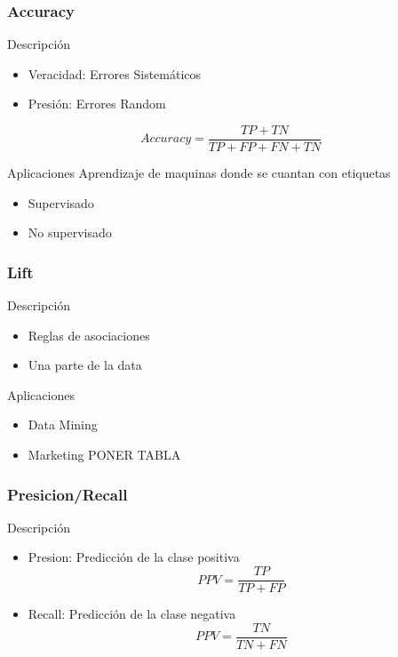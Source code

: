 \documentclass{beamer}
\begin{document}
\begin{frame}
  \frametitle{Accuracy}

  \begin{block}{Descripci\'on}
  \begin{itemize}
  \item Veracidad: Errores Sistem\'aticos
  \item Presi\'on: Errores Random
   
  \end{itemize}
  	
  	\[Accuracy= \dfrac{TP+TN}{TP+FP+FN+TN} \] 
  \end{block}
  \begin{block}{Aplicaciones}
  	Aprendizaje de maquinas donde se cuantan con etiquetas
  	\begin{itemize}
  \item Supervisado
  \item No supervisado
   
  \end{itemize}
  \end{block}
\end{frame}

  	
\begin{frame}
  \frametitle{Lift}

  \begin{block}{Descripci\'on}
  	\begin{itemize}

  	\item Reglas de asociaciones
  	\item Una parte de la data
   
  \end{itemize}
  \end{block}
  \begin{block}{Aplicaciones}

  	\begin{itemize}

  	\item Data Mining
  	\item Marketing
   PONER TABLA
  \end{itemize}
  
  \end{block}
\end{frame}

\begin{frame}
  \frametitle{Presicion/Recall}

  \begin{block}{Descripci\'on}
  	\begin{itemize}

  	\item Presion: Predicci\'on de la clase positiva 
  	\[PPV= \dfrac{TP}{TP+FP} \] 
  	\item Recall: Predicci\'on de la clase negativa
	\[PPV= \dfrac{TN}{TN+FN} \]   
	
  \end{itemize}
  
  \end{block}
 
\end{frame}
\end{document}
